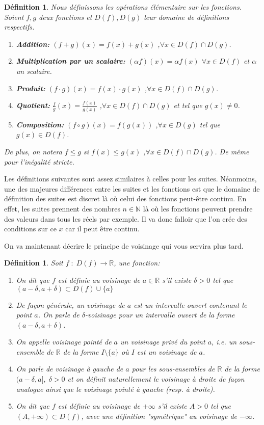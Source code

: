 \documentclass[a4paper, 12pt, french, twoside]{article}
\newtheorem{defi}[theorem]{Définition}
\newcommand{\Nn}{{\mathbb{N}}}
\newcommand{\Rr}{{\mathbb{R}}}
\begin{document}
\begin{defi}
    Nous définissons les opérations élémentaire sur les fonctions. Soient $f,g$ deux fonctions et $D(f), D(g)$ leur domaine de définitions respectifs. 
    \begin{enumerate}
        \item \textbf{Addition:} $(f+g)(x)=f(x)+g(x)$ ,$\forall x \in D(f)\cap D(g)$.
        \item \textbf{Multiplication par un scalaire:} $(\alpha f)(x)=\alpha f(x)$ $\forall x\in D(f)$ et $\alpha$ un scalaire.
        \item \textbf{Produit:} $(f\cdot g)(x)=f(x)\cdot g(x)$ ,$\forall x \in D(f)\cap D(g)$.
        \item \textbf{Quotient:} $\frac{f}{g}(x)=\frac{f(x)}{g(x)}$ ,$\forall x \in D(f)\cap D(g)$ et tel que $g(x)\neq 0$.
        \item \textbf{Composition:} $(f\circ g)(x)=f(g(x))$ ,$\forall x \in D(g)$ tel que $g(x)\in D(f)$.
    \end{enumerate}
    De plus, on notera $f\leq g$ si $f(x)\leq g(x)$ ,$\forall x \in D(f)\cap D(g)$. De même pour l'inégalité stricte. 
\end{defi}
Les définitions suivantes sont assez similaires à celles pour les suites. Néanmoins, une des majeures différences entre les suites et les fonctions est que le domaine de définition des suites est discret là où celui des fonctions peut-être continu. En effet, les suites prennent des nombres $n\in \Nn$ là où les fonctions peuvent prendre des valeurs dans tous les réels par exemple. Il va donc falloir que l'on crée des conditions sur ce $x$ car il peut être continu.

On va maintenant décrire le principe de voisinage qui vous servira plus tard.
\begin{defi}Soit $f\;:\; D(f)\longrightarrow \Rr$, une fonction: 
\begin{enumerate}
    \item On dit que $f$ est définie au voisinage de $a\in \Rr$ s'il existe $\delta >0$ tel que $(a-\delta,a+\delta)\subset D(f)\cup\{a\}$
    \item De façon générale, un voisinage de $a$ est un intervalle ouvert contenant le point $a$. On parle de $\delta $-voisinage pour un intervalle ouvert de la forme $(a-\delta,a+\delta)$. 
    \item On appelle voisinage pointé de $a$ un voisinage privé du point $a$, i.e. un sous-ensemble de $\Rr$ de la forme $I\setminus \{a\}$ où $I$ est un voisinage de $a$.
    \item On parle de voisinage à gauche de $a$ pour les sous-ensembles de $\Rr$ de la forme $(a-\delta,a],\; \delta>0$ et on définit naturellement le voisinage à droite de façon analogue ainsi que le voisinage pointé à gauche (resp. à droite).
    \item On dit que $f$ est définie au voisinage de $+\infty$ s'il existe $A>0$ tel que $(A,+\infty)\subset D(f)$, avec une définition "symétrique" au voisinage de $-\infty$.
\end{enumerate}
\end{defi}
\end{document}
